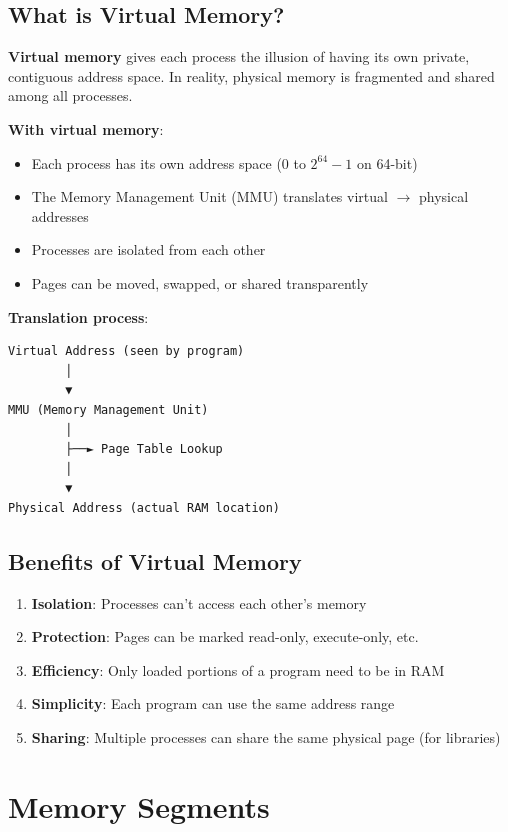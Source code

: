 \subsection{What is Virtual Memory?}

\textbf{Virtual memory} gives each process the illusion of having its own private, contiguous address space. In reality, physical memory is fragmented and shared among all processes.

\textbf{With virtual memory}:
\begin{itemize}
    \item Each process has its own address space (0 to $2^{64}-1$ on 64-bit)
    \item The Memory Management Unit (MMU) translates virtual $\rightarrow$ physical addresses
    \item Processes are isolated from each other
    \item Pages can be moved, swapped, or shared transparently
\end{itemize}

\textbf{Translation process}:
\begin{verbatim}
Virtual Address (seen by program)
        │
        ▼
MMU (Memory Management Unit)
        │
        ├──► Page Table Lookup
        │
        ▼
Physical Address (actual RAM location)
\end{verbatim}

\subsection{Benefits of Virtual Memory}

\begin{enumerate}
    \item \textbf{Isolation}: Processes can't access each other's memory
    \item \textbf{Protection}: Pages can be marked read-only, execute-only, etc.
    \item \textbf{Efficiency}: Only loaded portions of a program need to be in RAM
    \item \textbf{Simplicity}: Each program can use the same address range
    \item \textbf{Sharing}: Multiple processes can share the same physical page (for libraries)
\end{enumerate}

\section{Memory Segments}

